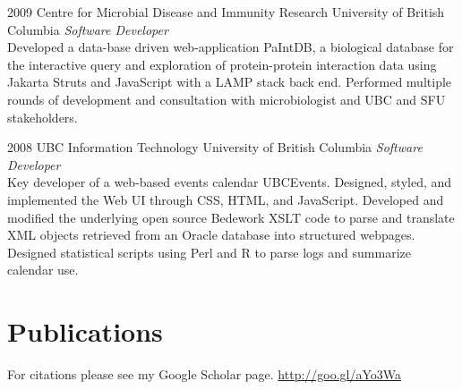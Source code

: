 \documentclass[print]{hanson_cv} %
\begin{document}
\begin{entrylist}
\entry
{2009}
{Centre for Microbial Disease and Immunity Research}
{University of British Columbia}
{\emph{Software Developer} \\
Developed a data-base driven web-application PaIntDB, a biological database for the interactive query and exploration of protein-protein interaction data using Jakarta Struts and JavaScript with a LAMP stack back end. Performed multiple rounds of development and consultation with microbiologist and UBC and SFU stakeholders.}
\end{entrylist}
\begin{entrylist}
\entry
{2008}
{UBC Information Technology}
{University of British Columbia}
{\emph{Software Developer} \\
Key developer of a web-based events calendar UBCEvents. Designed, styled, and implemented the Web UI through CSS, HTML, and JavaScript. Developed and modified the underlying open source Bedework XSLT code to parse and translate XML objects retrieved from an Oracle database into structured webpages. Designed statistical scripts using Perl and R to parse logs and summarize calendar use.}
\end{entrylist}

\section{Publications}

For citations please see my Google Scholar page. \href{http://goo.gl/aYo3Wa}{http://goo.gl/aYo3Wa}
\end{document}

